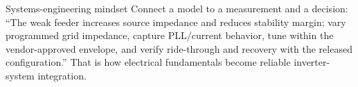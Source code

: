\documentclass[11pt]{article}
\begin{document}
\begin{keybox}{Systems-engineering mindset}
Connect a model to a measurement and a decision: ``The weak feeder increases
source impedance and reduces stability margin; vary programmed grid impedance,
capture PLL/current behavior, tune within the vendor-approved envelope, and
verify ride-through and recovery with the released configuration.'' That is how
electrical fundamentals become reliable inverter-system integration.
\end{keybox}
\end{document}
